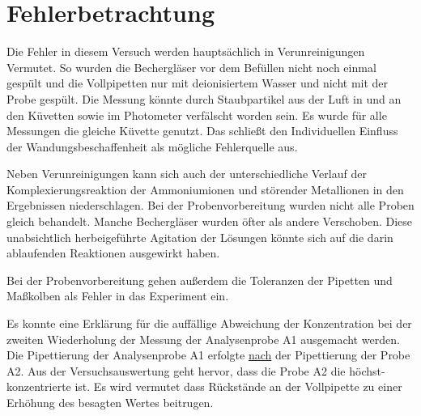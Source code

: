 \section{Fehlerbetrachtung}
\label{sec:fehler}

Die Fehler in diesem Versuch werden hauptsächlich in Verunreinigungen Vermutet. So wurden die Bechergläser vor dem Befüllen nicht noch einmal gespült und die Vollpipetten nur mit deionisiertem Wasser und nicht mit der Probe gespült. Die Messung könnte durch Staubpartikel aus der Luft in und an den Küvetten sowie im Photometer verfälscht worden sein. Es wurde für alle Messungen die gleiche Küvette genutzt. Das schließt den Individuellen Einfluss der Wandungsbeschaffenheit als mögliche Fehlerquelle aus. 

Neben Verunreinigungen kann sich auch der unterschiedliche Verlauf der Komplexierungsreaktion der Ammoniumionen und störender Metallionen in den Ergebnissen niederschlagen. Bei der Probenvorbereitung wurden nicht alle Proben gleich behandelt. Manche Bechergläser wurden öfter als andere Verschoben. Diese unabsichtlich herbeigeführte Agitation der Lösungen könnte sich auf die darin ablaufenden Reaktionen ausgewirkt haben. 

Bei der Probenvorbereitung gehen außerdem die Toleranzen der Pipetten und Maßkolben als Fehler in das Experiment ein. 

Es konnte eine Erklärung für die auffällige Abweichung der Konzentration bei der zweiten Wiederholung der Messung der Analysenprobe A1 ausgemacht werden. Die Pipettierung der Analysenprobe A1 erfolgte \underline{nach} der Pipettierung der Probe A2. Aus der Versuchsauswertung geht hervor, dass die Probe A2 die höchst-konzentrierte ist. Es wird vermutet dass Rückstände an der Vollpipette zu einer Erhöhung des besagten Wertes beitrugen.
